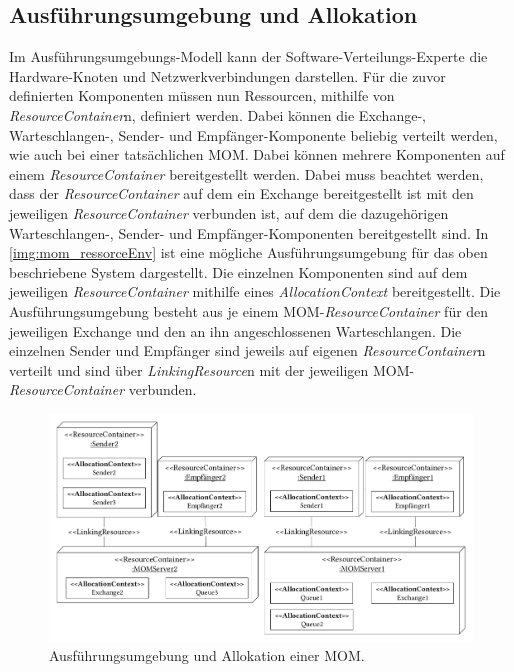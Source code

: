\subsection{Ausführungsumgebung und Allokation}
Im Ausführungsumgebungs-Modell kann der Software-Verteilungs-Experte die Hardware-Knoten und Netzwerkverbindungen darstellen. Für die zuvor definierten Komponenten müssen nun Ressourcen, mithilfe von \emph{ResourceContainer}n, definiert werden. Dabei können die Exchange-, Warteschlangen-, Sender- und Empfänger-Komponente beliebig verteilt werden, wie auch bei einer tatsächlichen MOM. Dabei können mehrere Komponenten auf einem \emph{ResourceContainer} bereitgestellt werden. Dabei muss beachtet werden, dass der \emph{ResourceContainer} auf dem ein Exchange bereitgestellt ist mit den jeweiligen \emph{ResourceContainer} verbunden ist, auf dem die dazugehörigen Warteschlangen-, Sender- und Empfänger-Komponenten bereitgestellt sind. In \autoref{img:mom_ressorceEnv} ist eine mögliche Ausführungsumgebung für das oben beschriebene System dargestellt. Die einzelnen Komponenten sind auf dem jeweiligen \emph{ResourceContainer} mithilfe eines \emph{AllocationContext} bereitgestellt. Die Ausführungsumgebung besteht aus je einem MOM-\emph{ResourceContainer} für den jeweiligen Exchange und den an ihn angeschlossenen Warteschlangen. Die einzelnen Sender und Empfänger sind jeweils auf eigenen \emph{ResourceContainer}n verteilt und sind über \emph{LinkingResource}n mit der jeweiligen MOM-\emph{ResourceContainer} verbunden. 
\begin{figure}
\center
  \includegraphics[width=1\textwidth]{images/modelling/modelingRecEnv.pdf}
  \caption{Ausführungsumgebung und Allokation einer MOM.}
  \label{img:mom_ressorceEnv}
\end{figure}

